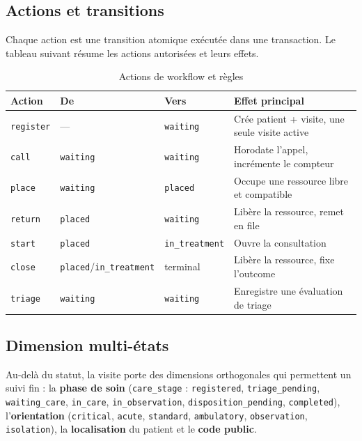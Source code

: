 \subsection{Actions et transitions}

Chaque action est une transition atomique exécutée dans une transaction. Le tableau suivant résume les actions autorisées et leurs effets.

\begin{table}[H]
\centering
\caption{Actions de workflow et règles}
\label{tab:actions}
\small
\begin{tabular}{|l|l|l|p{5.4cm}|}
\hline
\textbf{Action} & \textbf{De} & \textbf{Vers} & \textbf{Effet principal} \\
\hline
\texttt{register} & --- & \texttt{waiting} & Crée patient + visite, une seule visite active \\
\hline
\texttt{call} & \texttt{waiting} & \texttt{waiting} & Horodate l'appel, incrémente le compteur \\
\hline
\texttt{place} & \texttt{waiting} & \texttt{placed} & Occupe une ressource libre et compatible \\
\hline
\texttt{return} & \texttt{placed} & \texttt{waiting} & Libère la ressource, remet en file \\
\hline
\texttt{start} & \texttt{placed} & \texttt{in\_treatment} & Ouvre la consultation \\
\hline
\texttt{close} & \texttt{placed}/\texttt{in\_treatment} & terminal & Libère la ressource, fixe l'outcome \\
\hline
\texttt{triage} & \texttt{waiting} & \texttt{waiting} & Enregistre une évaluation de triage \\
\hline
\end{tabular}
\end{table}

\subsection{Dimension multi-états}

Au-delà du statut, la visite porte des dimensions orthogonales qui permettent un suivi fin : la \textbf{phase de soin} (\texttt{care\_stage} : \texttt{registered}, \texttt{triage\_pending}, \texttt{waiting\_care}, \texttt{in\_care}, \texttt{in\_observation}, \texttt{disposition\_pending}, \texttt{completed}), l'\textbf{orientation} (\texttt{critical}, \texttt{acute}, \texttt{standard}, \texttt{ambulatory}, \texttt{observation}, \texttt{isolation}), la \textbf{localisation} du patient et le \textbf{code public}.

